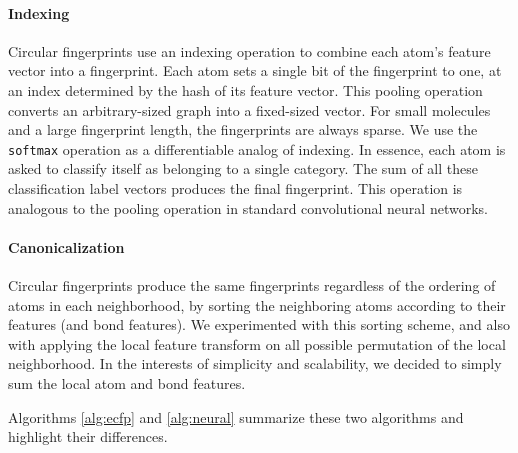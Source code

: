 \documentclass{article}
\begin{document}
\paragraph{Indexing}
Circular fingerprints use an indexing operation to combine each atom's feature vector into a fingerprint.
Each atom sets a single bit of the fingerprint to one, at an index determined by the hash of its feature vector.
This pooling operation converts an arbitrary-sized graph into a fixed-sized vector.
For small molecules and a large fingerprint length, the fingerprints are always sparse.
We use the \texttt{softmax} operation as a differentiable analog of indexing.
In essence, each atom is asked to classify itself as belonging to a single category.
The sum of all these classification label vectors produces the final fingerprint.
This operation is analogous to the pooling operation in standard convolutional neural networks.

\paragraph{Canonicalization}
Circular fingerprints produce the same fingerprints regardless of the ordering of atoms in each neighborhood, by sorting the neighboring atoms according to their features (and bond features).
We experimented with this sorting scheme, and also with applying the local feature transform on all possible permutation of the local neighborhood.
In the interests of simplicity and scalability, we decided to simply sum the local atom and bond features.

Algorithms \ref{alg:ecfp} and \ref{alg:neural} summarize these two algorithms and highlight their differences.
\end{document}
